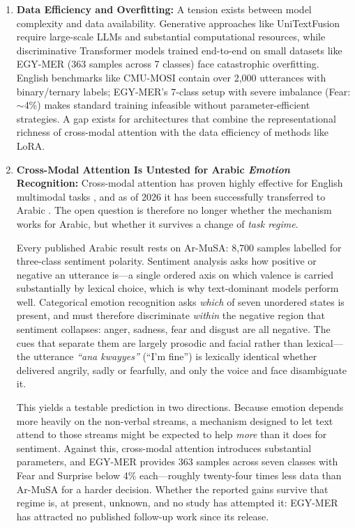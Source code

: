 \documentclass[12pt, a4paper]{article}
\begin{document}
\begin{enumerate}
    \item \textbf{Data Efficiency and Overfitting:} A tension exists between model complexity and data availability. Generative approaches like UniTextFusion \citep{KhaledUniText2025} require large-scale LLMs and substantial computational resources, while discriminative Transformer models trained end-to-end on small datasets like EGY-MER (363 samples across 7 classes) face catastrophic overfitting. English benchmarks like CMU-MOSI contain over 2,000 utterances with binary/ternary labels; EGY-MER's 7-class setup with severe imbalance (Fear: $\sim$4\%) makes standard training infeasible without parameter-efficient strategies. A gap exists for architectures that combine the representational richness of cross-modal attention with the data efficiency of methods like LoRA.

    \item \textbf{Cross-Modal Attention Is Untested for Arabic \emph{Emotion} Recognition:} Cross-modal attention has proven highly effective for English multimodal tasks \citep{Tsai2019}, and as of 2026 it has been successfully transferred to Arabic \citep{Cheikhi2026, Cheikhi2026a, Cheikhi2026b}. The open question is therefore no longer whether the mechanism works for Arabic, but whether it survives a change of \emph{task regime}.

    Every published Arabic result rests on Ar-MuSA: 8{,}700 samples labelled for three-class sentiment polarity. Sentiment analysis asks how positive or negative an utterance is---a single ordered axis on which valence is carried substantially by lexical choice, which is why text-dominant models perform well. Categorical emotion recognition asks \emph{which} of seven unordered states is present, and must therefore discriminate \emph{within} the negative region that sentiment collapses: anger, sadness, fear and disgust are all negative. The cues that separate them are largely prosodic and facial rather than lexical---the utterance \textit{``ana kwayyes''} (``I'm fine'') is lexically identical whether delivered angrily, sadly or fearfully, and only the voice and face disambiguate it.

    This yields a testable prediction in two directions. Because emotion depends more heavily on the non-verbal streams, a mechanism designed to let text attend to those streams might be expected to help \emph{more} than it does for sentiment. Against this, cross-modal attention introduces substantial parameters, and EGY-MER provides 363 samples across seven classes with Fear and Surprise below 4\% each---roughly twenty-four times less data than Ar-MuSA for a harder decision. Whether the reported gains survive that regime is, at present, unknown, and no study has attempted it: EGY-MER has attracted no published follow-up work since its release.
\end{enumerate}
\end{document}
